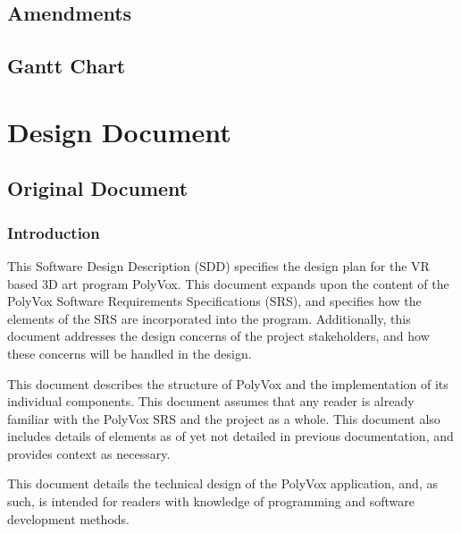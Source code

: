 \documentclass[onecolumn, draftclsnofoot,10pt, compsoc]{IEEEtran}
\newcounter{threesection}[subsubsection]
\begin{document}
\subsection{Amendments}

\subsection{Gantt Chart}



\pagebreak
\section{Design Document}

\subsection{Original Document}

\subsubsection{Introduction}

This Software Design Description (SDD) specifies the design plan for the VR based 3D art program PolyVox.
This document expands upon the content of the PolyVox Software Requirements Specifications (SRS), and specifies how the elements of the SRS are incorporated into the program.
Additionally, this document addresses the design concerns of the project stakeholders, and how these concerns will be handled in the design. 

This document describes the structure of PolyVox and the implementation of its individual components.
This document assumes that any reader is already familiar with the PolyVox SRS and the project as a whole.
This document also includes details of elements as of yet not detailed in previous documentation, and provides context as necessary.

This document details the technical design of the PolyVox application, and, as such, is intended for readers with knowledge of programming and software development methods. 
\end{document}
